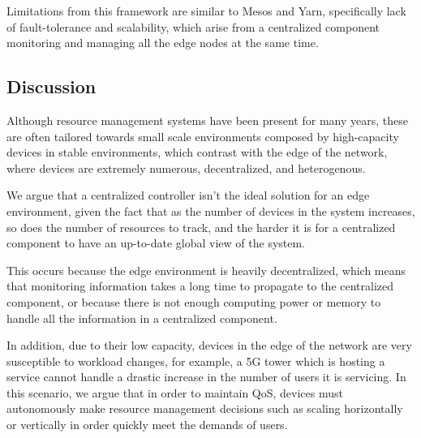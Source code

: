 Limitations from this framework are similar to Mesos and Yarn, specifically lack of fault-tolerance and scalability, which arise from a centralized component monitoring and managing all the edge nodes at the same time. 

\subsection{Discussion}

Although resource management systems have been present for many years, these are often tailored towards small scale environments composed by high-capacity devices in stable environments, which contrast with the edge of the network, where devices are extremely numerous, decentralized, and heterogenous.

We argue that a centralized controller isn't the ideal solution for an edge environment, given the fact that as the number of devices in the system increases, so does the number of resources to track, and the harder it is for a centralized component to have an up-to-date global view of the system. 

This occurs because the edge environment is heavily decentralized, which means that monitoring information takes a long time to propagate to the centralized component, or because there is not enough computing power or memory to handle all the information in a centralized component.

In addition, due to their low capacity, devices in the edge of the network are very susceptible to workload changes, for example, a 5G tower which is hosting a service cannot handle a drastic increase in the number of users it is servicing. In this scenario, we argue that in order to maintain QoS, devices must autonomously make resource management decisions such as scaling horizontally or vertically in order quickly meet the demands of users.



